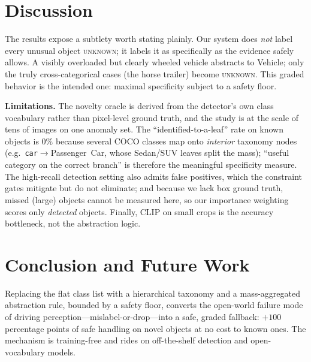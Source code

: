 \documentclass[conference]{IEEEtran}
\begin{document}
\section{Discussion}
\label{sec:discussion}

The results expose a subtlety worth stating plainly. Our system does \emph{not}
label every unusual object \textsc{unknown}; it labels it as specifically as the
evidence safely allows. A visibly overloaded but clearly wheeled vehicle
abstracts to \textsf{Vehicle}; only the truly cross-categorical cases (the horse
trailer) become \textsc{unknown}. This graded behavior is the intended one:
maximal specificity subject to a safety floor.

\textbf{Limitations.} The novelty oracle is derived from the detector's own class
vocabulary rather than pixel-level ground truth, and the study is at the scale of
tens of images on one anomaly set. The ``identified-to-a-leaf'' rate on known
objects is $0\%$ because several COCO classes map onto \emph{interior} taxonomy
nodes (e.g.\ \texttt{car}$\rightarrow$\textsf{Passenger~Car}, whose Sedan/SUV
leaves split the mass); ``useful category on the correct branch'' is therefore
the meaningful specificity measure. The high-recall detection setting also admits
false positives, which the constraint gates mitigate but do not eliminate; and
because we lack box ground truth, missed (large) objects cannot be measured here,
so our importance weighting scores only \emph{detected} objects. Finally, CLIP on
small crops is the accuracy bottleneck, not the abstraction logic.

\section{Conclusion and Future Work}
\label{sec:conclusion}

Replacing the flat class list with a hierarchical taxonomy and a mass-aggregated
abstraction rule, bounded by a safety floor, converts the open-world failure mode
of driving perception---mislabel-or-drop---into a safe, graded fallback:
$+100$ percentage points of safe handling on novel objects at no cost to known
ones. The mechanism is training-free and rides on off-the-shelf detection and
open-vocabulary models.
\end{document}
